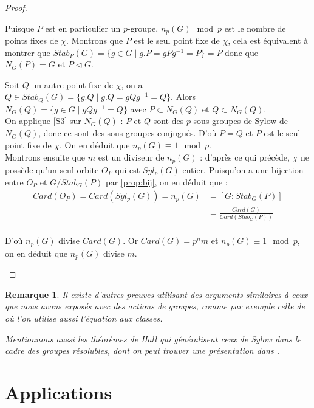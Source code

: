 \documentclass{article}
\theoremstyle{definition}
\theoremstyle{plain}
\theoremstyle{plain}
\theoremstyle{plain}
\theoremstyle{plain}
\newtheorem{remark}[subsubsection]{Remarque}
\theoremstyle{definition}
\theoremstyle{plain}
\theoremstyle{plain}
\begin{document}
\begin{proof}
\begin{enumerate}[label={\upshape(\roman*)}]
Puisque \( P \) est en particulier un \(p\)-groupe, \( n_p(G) \mod p \) est le nombre de points fixes de \( \chi \). Montrons que \( P \) est le seul point fixe de \( \chi \), cela est équivalent à montrer que \( Stab_P(G) = \{ g \in G \mid g.P = gPg^{-1} = P \} = P \) donc que \( N_G(P) = G \) et \( P \triangleleft G \). 

Soit \( Q \) un autre point fixe de \( \chi \), on a \(Q \in Stab_Q(G) = \{g.Q \mid g.Q = gQg^{-1} = Q \}  \). Alors \( N_G(Q) = \{ g \in G \mid gQg^{-1} = Q\} \) avec \( P \subset N_G(Q) \) et \( Q \subset N_G(Q) \). \\
On applique \ref{S3} sur \( N_G(Q) \) : \( P \) et \( Q \) sont des \(p\)-sous-groupes de Sylow de \( N_G(Q) \), donc ce sont des sous-groupes conjugués. D'où \( P = Q \) et \( P \) est le seul point fixe de \( \chi \). On en déduit que \( n_p(G) \equiv 1 \mod p \). \\
Montrons ensuite que \( m \) est un diviseur de \( n_p(G) \) : d'après ce qui précède, \( \chi \) ne possède qu'un seul orbite \( O_P \) qui est \( Syl_p({G}) \) entier. Puisqu'on a une bijection entre \( O_P \) et \( G/Stab_G(P) \) par \ref{prop:bij}, on en déduit que :
\begin{align*}
	Card(O_P)= Card(Syl_p(G)) = n_p(G) &= [G : Stab_G(P) ] \\ 
		 &= \frac{Card(G)}{Card(Stab_G(P))}\\
\end{align*}

D'où \( n_p(G) \) divise \( Card(G) \). Or \( Card(G) = p^{n}m \) et \( n_p(G) \equiv 1\mod p \), on en déduit que \( n_p(G) \) divise \( m \).
	\end{enumerate}
\end{proof}

\begin{remark}
	Il existe d'autres preuves utilisant des arguments similaires à ceux que nous avons exposés avec des actions de groupes, comme par exemple celle de \cite[p.~ 140-141]{dummit2003abstract} où l'on utilise aussi l'équation aux classes.

	Mentionnons aussi les théorèmes de Hall qui généralisent ceux de Sylow dans le cadre des groupes résolubles, dont on peut trouver une présentation dans \cite[p.~ 40-44]{serre1979ens}.
\end{remark}

\section{Applications}
\end{document}
